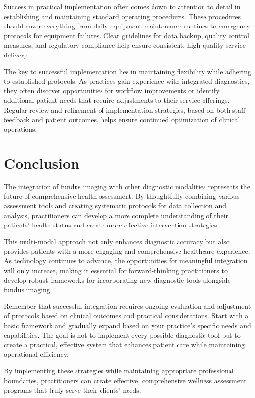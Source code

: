 \documentclass[
  Letterpaper,
]{scrbook}
\begin{document}
Success in practical implementation often comes down to attention to
detail in establishing and maintaining standard operating procedures.
These procedures should cover everything from daily equipment
maintenance routines to emergency protocols for equipment failures.
Clear guidelines for data backup, quality control measures, and
regulatory compliance help ensure consistent, high-quality service
delivery.

The key to successful implementation lies in maintaining flexibility
while adhering to established protocols. As practices gain experience
with integrated diagnostics, they often discover opportunities for
workflow improvements or identify additional patient needs that require
adjustments to their service offerings. Regular review and refinement of
implementation strategies, based on both staff feedback and patient
outcomes, helps ensure continued optimization of clinical operations.

\section{Conclusion}\label{conclusion-4}

The integration of fundus imaging with other diagnostic modalities
represents the future of comprehensive health assessment. By
thoughtfully combining various assessment tools and creating systematic
protocols for data collection and analysis, practitioners can develop a
more complete understanding of their patients' health status and create
more effective intervention strategies.

This multi-modal approach not only enhances diagnostic accuracy but also
provides patients with a more engaging and comprehensive healthcare
experience. As technology continues to advance, the opportunities for
meaningful integration will only increase, making it essential for
forward-thinking practitioners to develop robust frameworks for
incorporating new diagnostic tools alongside fundus imaging.

Remember that successful integration requires ongoing evaluation and
adjustment of protocols based on clinical outcomes and practical
considerations. Start with a basic framework and gradually expand based
on your practice's specific needs and capabilities. The goal is not to
implement every possible diagnostic tool but to create a practical,
effective system that enhances patient care while maintaining
operational efficiency.

By implementing these strategies while maintaining appropriate
professional boundaries, practitioners can create effective,
comprehensive wellness assessment programs that truly serve their
clients' needs.
\end{document}
